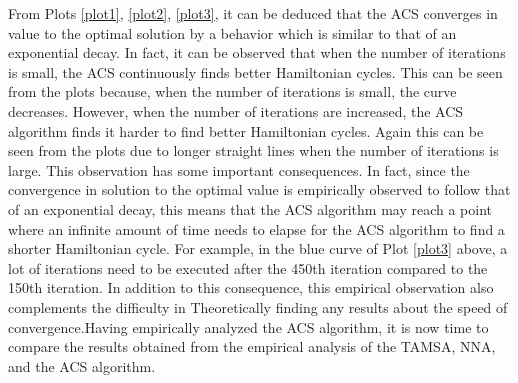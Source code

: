 \documentclass{article}
\begin{document}
From Plots \ref{plot1}, \ref{plot2}, \ref{plot3}, it can be deduced that the ACS converges in value to the optimal solution by a behavior which is similar to that of an exponential decay. In fact, it can be observed that when the number of iterations is small, the ACS continuously finds better Hamiltonian cycles. This can be seen from the plots because, when the number of iterations is small, the curve decreases. However, when the number of iterations are increased, the ACS algorithm finds it harder to find better Hamiltonian cycles. Again this can be seen from the plots due to longer straight lines when the number of iterations is large. This observation has some important consequences. In fact, since the convergence in solution to the optimal value is empirically observed to follow that of an exponential decay, this means that the ACS algorithm may reach a point where an infinite amount of time needs to elapse for the ACS algorithm to find a shorter Hamiltonian cycle. For example, in the blue curve of Plot \ref{plot3} above, a lot of iterations need to be executed after the 450th iteration compared to the 150th iteration. In addition to this consequence, this empirical observation also complements the difficulty in Theoretically finding any results about the speed of convergence.Having empirically analyzed the ACS algorithm, it is now time to compare the results obtained from the empirical analysis of the TAMSA, NNA, and the ACS algorithm. 
\end{document}
